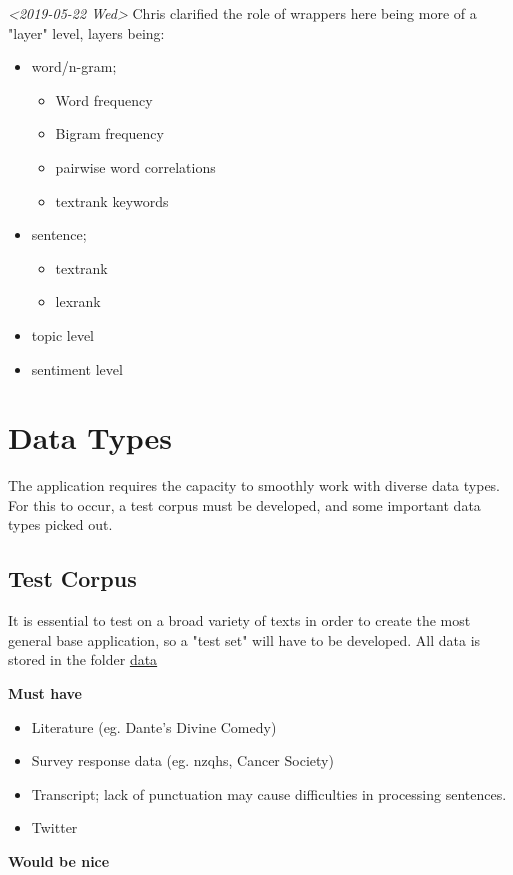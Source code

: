 \documentclass[11pt]{article}
\begin{document}
\textit{<2019-05-22 Wed> } Chris clarified the role of wrappers here being more
of a "layer" level, layers being:
\begin{itemize}
\item word/n-gram;
\begin{itemize}
\item Word frequency
\item Bigram frequency
\item pairwise word correlations
\item textrank keywords
\end{itemize}
\item sentence;
\begin{itemize}
\item textrank
\item lexrank
\end{itemize}
\item topic level
\item sentiment level
\end{itemize}
\section{Data Types}
\label{sec:org13f2daf}
The application requires the capacity to smoothly work with diverse
data types. For this to occur, a test corpus must be developed, and
some important data types picked out.
\subsection{Test Corpus}
\label{sec:org4960e69}
It is essential to test on a broad variety of texts in order to create
the most general base application, so a "test set" will have to be
developed. All data is stored in the folder \href{c:/Users/User/Desktop/stats-781/data}{data}

\textbf{Must have}

\begin{itemize}
\item Literature (eg. Dante's Divine Comedy)
\item Survey response data (eg. nzqhs, Cancer Society)
\item Transcript; lack of punctuation may cause difficulties in processing
sentences.
\item Twitter
\end{itemize}

\textbf{Would be nice}
\end{document}

